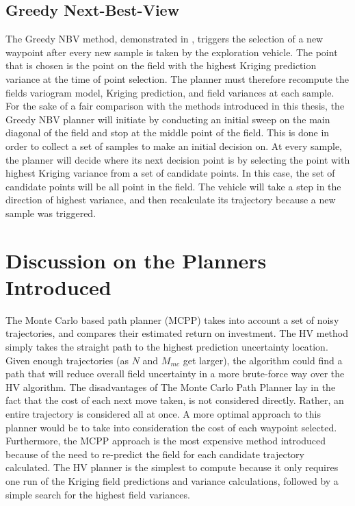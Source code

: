 \subsection{Greedy Next-Best-View}
The Greedy NBV method, demonstrated in \cite{fentanes:soilkrig}, triggers the selection of a new waypoint after every new sample is taken by the exploration vehicle. The point that is chosen is the point on the field with the highest Kriging prediction variance at the time of point selection. The planner must therefore recompute the fields variogram model, Kriging prediction, and field variances at each sample. For the sake of a fair comparison with the methods introduced in this thesis, the Greedy NBV planner will initiate by conducting an initial sweep on the main diagonal of the field and stop at the middle point of the field. This is done in order to collect a set of samples to make an initial decision on. At every sample, the planner will decide where its next decision point is by selecting the point with highest Kriging variance from a set of candidate points. In this case, the set of candidate points will be all point in the field. The vehicle will take a step in the direction of highest variance, and then recalculate its trajectory because a new sample was triggered.

\section{Discussion on the Planners Introduced}
The Monte Carlo based path planner (MCPP) takes into account a set of noisy trajectories, and compares their estimated return on investment. The HV method simply takes the straight path to the highest prediction uncertainty location. Given enough trajectories (as $N$ and $M_{mc}$ get larger), the algorithm could find a path that will reduce overall field uncertainty in a more brute-force way over the HV algorithm. The disadvantages of The Monte Carlo Path Planner lay in the fact that the cost of each next move taken, is not considered directly. Rather, an entire trajectory is considered all at once. A more optimal approach to this planner would be to take into consideration the cost of each waypoint selected. Furthermore, the MCPP approach is the most expensive method introduced because of the need to re-predict the field for each candidate trajectory calculated. The HV planner is the simplest to compute because it only requires one run of the Kriging field predictions and variance calculations, followed by a simple search for the highest field variances.

